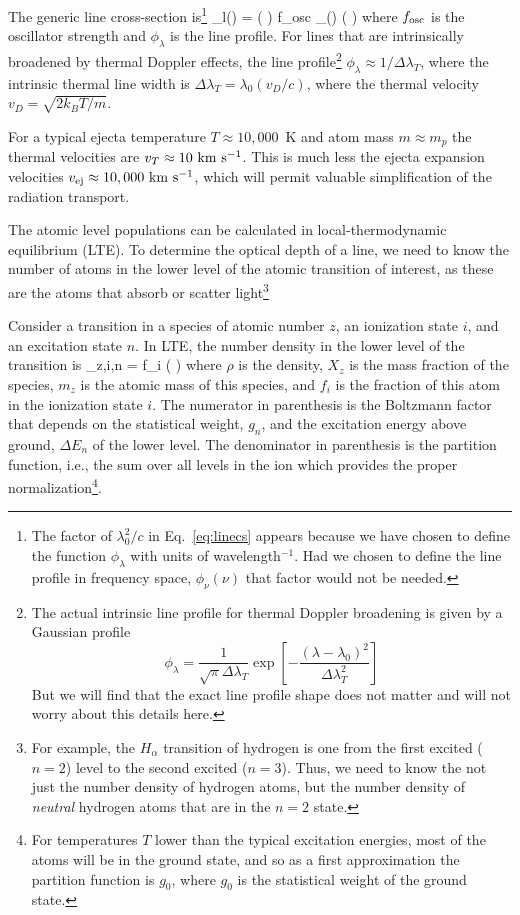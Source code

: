 \documentclass{tufte-handout}
\begin{document}
The generic line cross-section is\footnote{The factor of $\lambda_0^2/c$ in Eq.~\ref{eq:linecs} appears because we have chosen to define the function $\phi_\lambda$ with units of wavelength$^{-1}$. Had we chosen to define the line profile in frequency space, $\phi_\nu(\nu)$ that factor would not be needed.  } 
\beq
\sigma_l(\lambda) =  \left(  \right) f_{\rm osc} \phi_\lambda(\lambda) 
\left(  \right)
\label{eq:linecs}
\eeq
where $f_{\rm osc}$ is the oscillator strength and $\phi_\lambda$ is the line profile.
For lines that are intrinsically broadened by thermal Doppler effects, the line profile\footnote{
The actual intrinsic line profile for thermal Doppler broadening is given by a Gaussian profile
\[
\phi_\lambda = \frac{1}{\sqrt{\pi} \Delta \lambda_T} \exp \left[ - \frac{ ( \lambda - \lambda_0)^2}{\Delta \lambda_T^2} \right] 
\]
But we will find that the exact line profile shape does not matter and will not worry about this details here.}
  $\phi_\lambda \approx 1/\Delta \lambda_T$, where 
the intrinsic thermal line width is $\Delta \lambda_T = \lambda_0 (v_D/c)$, where the thermal velocity $v_D = \sqrt{2 k_B T/m}$.

For a typical ejecta temperature $T \approx 10,000$~K and atom mass $m \approx m_p$ the thermal velocities are $v_T \approx 10~{\rm km~s^{-1}}$.
This is much less the ejecta expansion velocities $v_{\rm ej} \approx 10,000~{\rm km~s^{-1}}$, which will permit valuable simplification of the radiation transport. 

 The atomic level populations can be calculated in local-thermodynamic equilibrium (LTE). To determine
the optical depth of a line, we need to know the number of atoms in the lower level of the atomic transition of interest, as these are the atoms that  absorb or scatter light\footnote{For example, the $H_\alpha$ transition of hydrogen is one from the first excited ($n=2$) level to the second excited ($n=3$). Thus, we need to know the not just the number density of hydrogen atoms, but the number density of {\it neutral} hydrogen atoms that are in the $n=2$ state.} 

Consider a transition in a species of atomic number $z$, an ionization state $i$, and an excitation state $n$.  In LTE, the number density in the lower level of the transition is
\beq
{}_{z,i,n} =  f_{i} 
\left(  \right)
\eeq
where $\rho$ is the density, $X_z$ is the mass fraction of the species, $m_z$ is the atomic mass of this species,  and $f_i$ is the fraction of this atom in the ionization state $i$. The numerator in 
parenthesis is the Boltzmann factor that depends on the statistical weight, $g_n$, and
the excitation energy above ground, $\Delta E_n$ of the lower level. The denominator in parenthesis is the partition function, i.e., the sum over all levels in the ion which provides the proper normalization\footnote{For temperatures $T$ lower than the typical excitation energies, most of the atoms
will be in the ground state, and so as a first approximation the partition function is $g_0$, where $g_0$ is the
statistical weight of the ground state.}.
\end{document}
